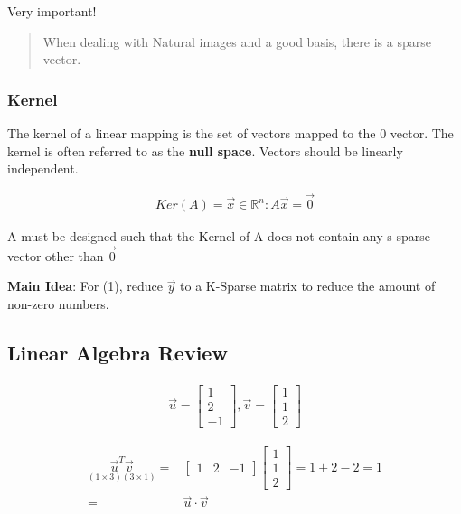 \documentclass[11pt]{article}
\begin{document}
Very important!
\begin{quote}
When dealing with Natural images and a good basis, there is a sparse vector.
\end{quote}

\subsubsection{Kernel}
\label{sec:orgeb880ab}
The kernel of a linear mapping is the set of
vectors mapped to the 0 vector. The kernel is often referred to as the \textbf{null
space}. Vectors should be linearly independent.

\begin{equation}
\begin{split}
Ker(A) = { \vec{x} \in \mathbb{R}^n \colon A \vec{x} = \vec{0}}
\end{split}
\end{equation}

A must be designed such that the Kernel of A does not contain any s-sparse
vector other than \(\vec 0\)

\textbf{Main Idea}: For (1), reduce \(\vec{y}\) to a K-Sparse matrix to reduce the amount
of non-zero numbers.

\subsection{Linear Algebra Review}
\label{sec:org9882e5c}
\begin{equation}
\begin{split}
\vec{u} = \begin{bmatrix}
1\\
2\\
-1
\end{bmatrix},
\vec{v} = \begin{bmatrix}
1\\
1\\
2
\end{bmatrix}
\end{split}
\end{equation}

\begin{equation}
\begin{split}
\underset{(1 \times 3)(3 \times 1)}{\vec{u}^T \vec{v}} = & \begin{bmatrix}
1 & 2 & -1
\end{bmatrix}\begin{bmatrix}
1\\
1\\
2
\end{bmatrix} = 1 + 2 - 2 = 1\\
= & \vec{u} \cdot \vec{v}
\end{split}
\end{equation}
\end{document}

